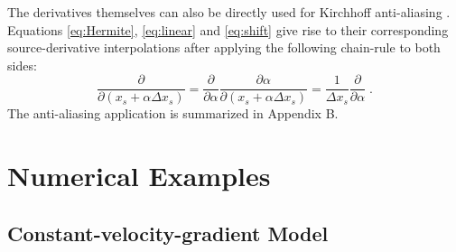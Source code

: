 The derivatives themselves can also be directly used for Kirchhoff anti-aliasing 
\cite[]{lumley,abma,fomel2}. Equations \ref{eq:Hermite}, \ref{eq:linear} 
and \ref{eq:shift} give rise to their corresponding source-derivative interpolations 
after applying the following chain-rule to both sides: 
\begin{equation}
\label{eq:dinterp}
\frac{\partial}{\partial (x_s + \alpha \Delta x_s)} = 
\frac{\partial}{\partial \alpha} 
\frac{\partial \alpha}{\partial (x_s + \alpha \Delta x_s)} = 
\frac{1}{\Delta x_s} \frac{\partial}{\partial \alpha}\;.
\end{equation}
The anti-aliasing application is summarized in Appendix B.

\section{Numerical Examples}

\subsection{Constant-velocity-gradient Model}

